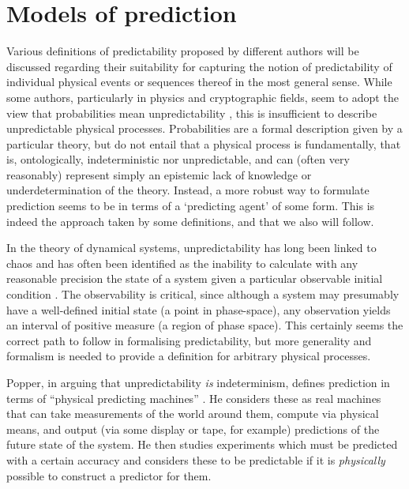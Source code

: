 \documentclass[%
 superscriptaddress,
 preprint,
 showpacs,
 showkeys,
 preprintnumbers,
  amsmath,amssymb,
  aps,
 pra,
  longbibliography,
  floatfix,
 ]{revtex4-1}
\theoremstyle{definition}
\begin{document}

\section{Models of prediction}

Various definitions of predictability  proposed by different authors will be discussed regarding their suitability for capturing the notion of predictability of individual physical events or sequences thereof in the most general sense.
While some authors, particularly in physics and cryptographic fields, seem to adopt the view that probabilities mean unpredictability \cite{Acin:2013qa,zeil-05_nature_ofQuantum}, this is insufficient to describe unpredictable physical processes.
Probabilities are a formal description given by a particular theory, but do not entail that a physical process is fundamentally{\color{green}, that is, ontologically,} indeterministic nor unpredictable, and can (often very reasonably) represent simply a{\color{green}n epistemic} lack of knowledge or underdetermination of the theory.
Instead, a more robust way to formulate prediction seems to be in terms of a `predicting agent' of some form.
This is indeed the approach taken by some definitions, and that we also will follow.

In the theory of dynamical systems, unpredictability has long been linked to chaos and has often been identified as the inability to calculate with any reasonable precision the state of a system given a particular observable initial condition \cite{Werndl:2009nx}.
The observability is critical, since although a system may presumably have a well-defined initial state (a point in phase-space), any observation yields an interval of positive measure (a region of phase space).
This certainly seems the correct path to follow in formalising predictability, but more generality and formalism is needed to provide a definition for arbitrary physical processes.

Popper, in arguing that unpredictability \emph{is} indeterminism, defines prediction in terms of ``physical predicting machines'' \cite{popper-50i}.
He considers these as real machines that can take measurements of the world around them, compute via physical means, and output (via some display or tape, for example) predictions of the future state of the system.
He then
studies experiments which must be predicted with a certain accuracy and considers these to be predictable if it is \emph{physically} possible to construct a predictor for them.
\end{document}
